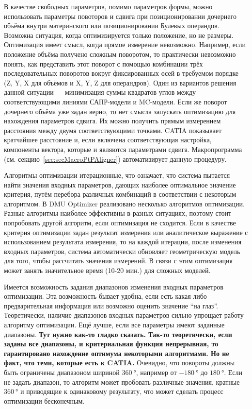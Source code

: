 В качестве свободных параметров, помимо параметров формы, можно использовать параметры повоторов и сдвига при позиционировании дочернего объёма внутри материнского или позиционировании Булевых операндов. Возможна ситуация, когда оптимизируется только положение, но не размеры. Оптимизация имеет смысл, когда прямое измерение невозможно. Например, если положение объёма получено сложным поворотом, то практически невозможно понять, как представить этот поворот с помощью комбинации трёх последовательных поворотов вокруг фиксированных осей в требуемом порядке (Z, Y, X для объёмов и X, Y, Z для операндров). Один из вариантов решения данной ситуации --- минимизация суммы квадратов углов между соответствующими линиями САПР-модели и MC-модели. Если же поворот дочернего объёма уже задан верно, то нет смысла запускать оптимизацию для нахождения параметров сдвига. Их можно получить прямым измерением расстояния между двумя соответствующими точками. CATIA показывает кратчайшее расстояние и, если включена соответствующая настройка, компоненты вектора, которые и являются параметрами сдвига. Макропрограмма  (см. секцию~\ref{sec:secMacroPtPAligner}) автоматизирует данную процедуру.

Алгоритмы оптимизации итерационные, что означает, что система пытается найти значения входных параметров, дающих наиболее оптимальное значение критерия, путём перебора различных комбинаций в соответствии с некоторым алгоритмом. В DMU Optimizer реализовано несколько алгоритмов оптимизации. Разные алгоритмы наиболее эффективны в разных ситуациях, поэтому стоит попробовать другой алгоритм, если оптимизация не сходится. Если в качестве критерия оптимизации задан результат измерения или аналитическое выражение с использованием результата измерения, то на каждой итерации, после изменения входных параметров, система автоматически обновляет геометрическую модель для того, чтобы рассчитать значения измерений. В связи с этим оптимизация может занять значительное время (10-20 мин.) для сложных моделей.

Имеется возможность задания диапазонов изменения входных параметров оптимизации. Эта возможность бывает удобна, если есть какая-либо предварительная информация или возможно оценить значение ``на глаз''.
\todo Теоретически, наличие диапазонов входных параметров сильно упрощает работу алгоритму оптимизации. Ещё лучше, если все параметры имеют заданные диапазоны. \todo \textbf{Тут нужно как-то гладко сказать. Так-то теоретически, если заданы все диапазоны, и критериальная функция непрерывная, то гарантировано нахождение оптимума некоторыми алгоритмами. Но не факт, что теми, которые есть к CATIA.}
Очевидно, что повороты должны быть ограничены диапазоном шириной $\SI{360}{\degree}$, например от $\SI{-180}{\degree}$ до $\SI{180}{\degree}$. Если не задать диапазон, то алгоритм может пробовать различные значения, кратные $\SI{360}{\degree}$ и приводящие к одинаковому результату, что может сделать процесс оптимизации бесконечным.

